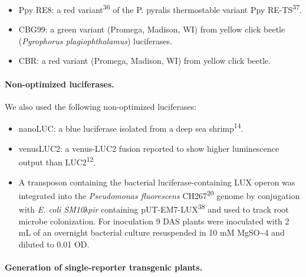 \documentclass[]{article}
\begin{document}
\begin{itemize}
\item
  Ppy RE8: a red variant\textsuperscript{36} of the P. pyralis
  thermostable variant Ppy RE-TS\textsuperscript{37}.
\item
  CBG99: a green variant (Promega, Madison, WI) from yellow click beetle
  (\emph{Pyrophorus plagiophthalamus}) luciferases.
\item
  CBR: a red variant (Promega, Madison, WI) from yellow click beetle.
\end{itemize}

\paragraph{Non-optimized luciferases.}\label{non-optimized-luciferases.}

We also used the following non-optimized luciferases:

\begin{itemize}
\item
  nanoLUC: a blue luciferase isolated from a deep sea
  shrimp\textsuperscript{14}.
\item
  venusLUC2: a venus-LUC2 fusion reported to show higher luminescence
  output than LUC2\textsuperscript{12}.
\item
  A transposon containing the bacterial luciferase-containing LUX operon
  was integrated into the \emph{Pseudomonas fluorescens}
  CH267\textsuperscript{20} genome by conjugation with \emph{E. coli
  SM10λpir} containing pUT-EM7-LUX\textsuperscript{38} and used to track
  root microbe colonization. For inoculation 9 DAS plants were
  inoculated with 2 mL of an overnight bacterial culture resuspended in
  10 mM MgSO\textasciitilde{}4 and diluted to 0.01 OD.
\end{itemize}

\paragraph{Generation of single-reporter transgenic
plants.}\label{generation-of-single-reporter-transgenic-plants.}
\end{document}

